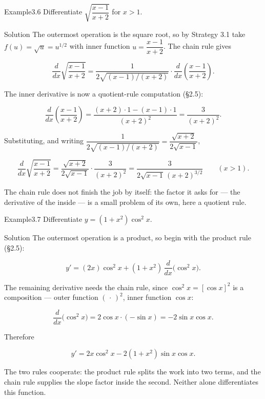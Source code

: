 \begin{hkworkedexample}
\begin{hkexample}{Example}{3.6}{}
Differentiate \(\sqrt{\dfrac{x - 1}{x + 2}}\) for \(x > 1\).
\end{hkexample}
\begin{hksolution}{Solution}{}{}
The outermost operation is the square root, so by Strategy 3.1 take \(f(u) = \sqrt{u} = u^{1/2}\) with inner function \(u = \dfrac{x - 1}{x + 2}\). The chain rule gives

\[ \frac{d}{dx}\sqrt{\frac{x - 1}{x + 2}} = \frac{1}{2\sqrt{(x - 1)/(x + 2)}}\cdot\frac{d}{dx}\!\left(\frac{x - 1}{x + 2}\right). \]

The inner derivative is now a quotient-rule computation (§2.5):

\[ \frac{d}{dx}\!\left(\frac{x - 1}{x + 2}\right) = \frac{(x + 2)\cdot 1 - (x - 1)\cdot 1}{(x + 2)^{2}} = \frac{3}{(x + 2)^{2}}. \]

Substituting, and writing \(\dfrac{1}{2\sqrt{(x - 1)/(x + 2)}} = \dfrac{\sqrt{x + 2}}{2\sqrt{x - 1}}\),

\[ \frac{d}{dx}\sqrt{\frac{x - 1}{x + 2}} = \frac{\sqrt{x + 2}}{2\sqrt{x - 1}}\cdot\frac{3}{(x + 2)^{2}} = \frac{3}{2\sqrt{x - 1}\,(x + 2)^{3/2}} \qquad (x > 1). \]

The chain rule does not finish the job by itself: the factor it asks for — the derivative of the inside — is a small problem of its own, here a quotient rule.
\end{hksolution}
\end{hkworkedexample}
\begin{hkworkedexample}
\begin{hkexample}{Example}{3.7}{}
Differentiate \(y = (1 + x^{2})\cos^{2} x\).
\end{hkexample}
\begin{hksolution}{Solution}{}{}
The outermost operation is a product, so begin with the product rule (§2.5):

\[ y' = (2x)\cos^{2} x + (1 + x^{2})\,\frac{d}{dx}\bigl(\cos^{2} x\bigr). \]

The remaining derivative needs the chain rule, since \(\cos^{2} x = [\cos x]^{2}\) is a composition — outer function \((\,\cdot\,)^{2}\), inner function \(\cos x\):

\[ \frac{d}{dx}\bigl(\cos^{2} x\bigr) = 2\cos x\cdot(-\sin x) = -2\sin x\cos x. \]

Therefore

\[ y' = 2x\cos^{2} x - 2(1 + x^{2})\sin x\cos x. \]

The two rules cooperate: the product rule splits the work into two terms, and the chain rule supplies the slope factor inside the second. Neither alone differentiates this function.
\end{hksolution}
\end{hkworkedexample}
